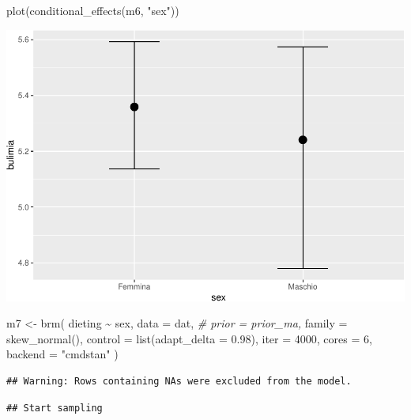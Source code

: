 \documentclass[
]{article}
\newenvironment{Shaded}{\begin{snugshade}}{\end{snugshade}}
\newcommand{\AttributeTok}[1]{\textcolor[rgb]{0.77,0.63,0.00}{#1}}
\newcommand{\CommentTok}[1]{\textcolor[rgb]{0.56,0.35,0.01}{\textit{#1}}}
\newcommand{\DecValTok}[1]{\textcolor[rgb]{0.00,0.00,0.81}{#1}}
\newcommand{\FloatTok}[1]{\textcolor[rgb]{0.00,0.00,0.81}{#1}}
\newcommand{\FunctionTok}[1]{\textcolor[rgb]{0.00,0.00,0.00}{#1}}
\newcommand{\NormalTok}[1]{#1}
\newcommand{\OtherTok}[1]{\textcolor[rgb]{0.56,0.35,0.01}{#1}}
\newcommand{\SpecialCharTok}[1]{\textcolor[rgb]{0.00,0.00,0.00}{#1}}
\newcommand{\StringTok}[1]{\textcolor[rgb]{0.31,0.60,0.02}{#1}}
\begin{document}
\begin{Shaded}
\begin{Highlighting}[]
\FunctionTok{plot}\NormalTok{(}\FunctionTok{conditional\_effects}\NormalTok{(m6, }\StringTok{"sex"}\NormalTok{))}
\end{Highlighting}
\end{Shaded}

\includegraphics{050_quest_groups_files/figure-latex/unnamed-chunk-2-10.pdf}

\begin{Shaded}
\begin{Highlighting}[]
\NormalTok{m7 }\OtherTok{\textless{}{-}} \FunctionTok{brm}\NormalTok{(}
\NormalTok{  dieting }\SpecialCharTok{\textasciitilde{}}\NormalTok{ sex,}
  \AttributeTok{data =}\NormalTok{ dat, }
  \CommentTok{\# prior = prior\_ma,}
  \AttributeTok{family =} \FunctionTok{skew\_normal}\NormalTok{(),}
  \AttributeTok{control =} \FunctionTok{list}\NormalTok{(}\AttributeTok{adapt\_delta =} \FloatTok{0.98}\NormalTok{),}
  \AttributeTok{iter =} \DecValTok{4000}\NormalTok{,}
  \AttributeTok{cores =} \DecValTok{6}\NormalTok{,}
  \AttributeTok{backend =} \StringTok{"cmdstan"}
\NormalTok{)}
\end{Highlighting}
\end{Shaded}

\begin{verbatim}
## Warning: Rows containing NAs were excluded from the model.
\end{verbatim}

\begin{verbatim}
## Start sampling
\end{verbatim}
\end{document}
